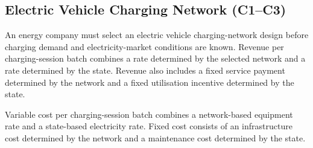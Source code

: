 
\subsection{Electric Vehicle Charging Network (C1--C3)}
\label{sec:problem21-electric-vehicle-charging-network-c1-c3}

An energy company must select an electric vehicle charging-network design
before charging demand and electricity-market conditions are known. Revenue per
charging-session batch combines a rate determined by the selected network and a
rate determined by the state. Revenue also includes a fixed service payment
determined by the network and a fixed utilisation incentive determined by the
state.

Variable cost per charging-session batch combines a network-based equipment
rate and a state-based electricity rate. Fixed cost consists of an
infrastructure cost determined by the network and a maintenance cost determined
by the state.

